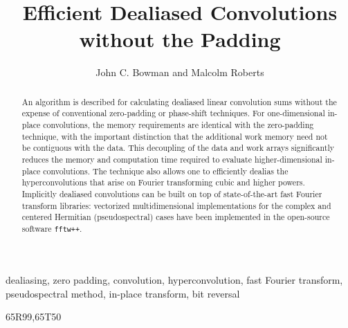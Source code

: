 \documentclass[final]{siamltex}
\begin{document}
\title{Efficient Dealiased Convolutions without the Padding}
\author{John C. Bowman and Malcolm Roberts}
\maketitle

\begin{abstract}
An algorithm is described for calculating dealiased linear convolution sums
without the expense of conventional zero-padding or phase-shift
techniques. For one-dimensional in-place convolutions, the memory
requirements are identical with the zero-padding technique, with the important
distinction that the additional work memory need not be contiguous with the
data. This decoupling of the data and work arrays significantly reduces
the memory and computation time required to evaluate higher-dimensional
in-place convolutions. The technique also allows one to efficiently dealias the
hyperconvolutions that arise on Fourier transforming cubic and higher powers.
Implicitly dealiased convolutions can be built on top of state-of-the-art
fast Fourier transform libraries: vectorized multidimensional implementations
for the complex and centered Hermitian (pseudospectral) cases have
been implemented in the open-source software {\tt fftw++}.
\end{abstract} 

\begin{keywords} 
dealiasing, zero padding, convolution, hyperconvolution, fast Fourier transform,
pseudospectral method, in-place transform, bit reversal
\end{keywords}

\begin{AMS}
65R99,65T50
\end{AMS}

\pagestyle{myheadings}


% 




%

\end{document}
